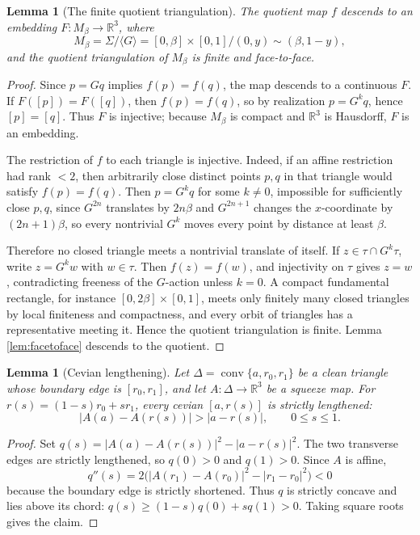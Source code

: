 \documentclass[12pt]{article}
\newcommand{\R}{\mathbb R}
\theoremstyle{plain}
\newtheorem{lemma}[theorem]{Lemma}
\begin{document}
\begin{lemma}[The finite quotient triangulation]\label{lem:quotient}
The quotient map \(f\) descends to an embedding
\(F:M_\beta\to\R^3\), where
\[
M_\beta=\Sigma/\langle G\rangle
      =[0,\beta]\times[0,1]/(0,y)\sim(\beta,1-y),
\]
and the quotient triangulation of \(M_\beta\) is finite and face-to-face.
\end{lemma}

\begin{proof}
Since \(p=Gq\) implies \(f(p)=f(q)\), the map descends to a continuous
\(F\).  If \(F([p])=F([q])\), then \(f(p)=f(q)\), so by realization
\(p=G^kq\), hence \([p]=[q]\).  Thus \(F\) is injective; because \(M_\beta\)
is compact and \(\R^3\) is Hausdorff, \(F\) is an embedding.

The restriction of \(f\) to each triangle is injective.  Indeed, if an affine
restriction had rank \(<2\), then arbitrarily close distinct points
\(p,q\) in that triangle would satisfy \(f(p)=f(q)\).  Then \(p=G^kq\) for
some \(k\ne0\), impossible for sufficiently close \(p,q\), since
\(G^{2n}\) translates by \(2n\beta\) and \(G^{2n+1}\) changes the
\(x\)-coordinate by \((2n+1)\beta\), so every nontrivial \(G^k\) moves every
point by distance at least \(\beta\).

Therefore no closed triangle meets a nontrivial translate of itself.  If
\(z\in\tau\cap G^k\tau\), write \(z=G^kw\) with \(w\in\tau\).  Then
\(f(z)=f(w)\), and injectivity on \(\tau\) gives \(z=w\), contradicting
freeness of the \(G\)-action unless \(k=0\).  A compact fundamental rectangle,
for instance \([0,2\beta]\times[0,1]\), meets only finitely many closed
triangles by local finiteness and compactness, and every orbit of triangles has
a representative meeting it.  Hence the quotient triangulation is finite.
Lemma \ref{lem:facetoface} descends to the quotient.
\end{proof}

\begin{lemma}[Cevian lengthening]\label{lem:cevian}
Let \(\Delta=\operatorname{conv}\{a,r_0,r_1\}\) be a clean triangle whose
boundary edge is \([r_0,r_1]\), and let \(A:\Delta\to\R^3\) be a squeeze map.
For \(r(s)=(1-s)r_0+sr_1\), every cevian \([a,r(s)]\) is strictly lengthened:
\[
|A(a)-A(r(s))|>|a-r(s)|,\qquad 0\le s\le1.
\]
\end{lemma}

\begin{proof}
Set \(q(s)=|A(a)-A(r(s))|^2-|a-r(s)|^2\).  The two transverse edges are
strictly lengthened, so \(q(0)>0\) and \(q(1)>0\).  Since \(A\) is affine,
\[
q''(s)=2\bigl(|A(r_1)-A(r_0)|^2-|r_1-r_0|^2\bigr)<0
\]
because the boundary edge is strictly shortened.  Thus \(q\) is strictly
concave and lies above its chord:
\(q(s)\ge(1-s)q(0)+sq(1)>0\).  Taking square roots gives the claim.
\end{proof}
\end{document}
